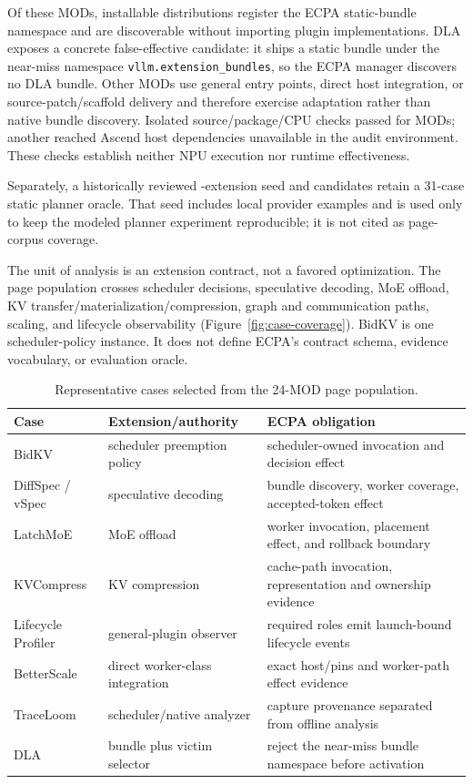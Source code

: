 \documentclass[letterpaper,twocolumn,10pt]{article}
\begin{document}
Of these MODs, \ECPAWorkshopBundleNamespace{} installable distributions register
the ECPA static-bundle namespace and are discoverable without importing plugin
implementations.  DLA exposes a concrete false-effective candidate: it ships a
static bundle under the near-miss namespace \texttt{vllm.extension\_bundles}, so
the ECPA manager discovers no DLA bundle.  Other MODs use general entry points,
direct host integration, or source-patch/scaffold delivery and therefore
exercise adaptation rather than native bundle discovery.  Isolated
source/package/CPU checks passed for \ECPAWorkshopTestPass{} MODs; another
\ECPAWorkshopEnvironmentBlocked{} reached Ascend host dependencies unavailable
in the audit environment.  These checks establish neither NPU execution nor
runtime effectiveness.

Separately, a historically reviewed \ECPAPlannerSeedExtensions{}-extension seed
and \ECPAAdaptationCandidates{} candidates retain a 31-case static planner
oracle.  That seed includes local provider examples and is used only to keep the
modeled planner experiment reproducible; it is not cited as page-corpus
coverage.

The unit of analysis is an extension contract, not a favored optimization.
The page population crosses scheduler decisions, speculative decoding, MoE
offload, KV transfer/materialization/compression, graph and communication paths,
scaling, and lifecycle observability (Figure~\ref{fig:case-coverage}).  BidKV is
one scheduler-policy instance.  It does
not define ECPA's contract schema, evidence vocabulary, or evaluation oracle.

\begin{table}[t]
\centering\small
\caption{Representative cases selected from the 24-MOD page population.}
\begin{tabularx}{\columnwidth}{@{}lXX@{}}
\toprule
Case & Extension/authority & ECPA obligation \\
\midrule
BidKV & scheduler preemption policy & scheduler-owned invocation and decision effect \\
DiffSpec / vSpec & speculative decoding & bundle discovery, worker coverage, accepted-token effect \\
LatchMoE & MoE offload & worker invocation, placement effect, and rollback boundary \\
KVCompress & KV compression & cache-path invocation, representation and ownership evidence \\
Lifecycle Profiler & general-plugin observer & required roles emit launch-bound lifecycle events \\
BetterScale & direct worker-class integration & exact host/pins and worker-path effect evidence \\
TraceLoom & scheduler/native analyzer & capture provenance separated from offline analysis \\
DLA & bundle plus victim selector & reject the near-miss bundle namespace before activation \\
\bottomrule
\end{tabularx}
\end{table}
\end{document}
